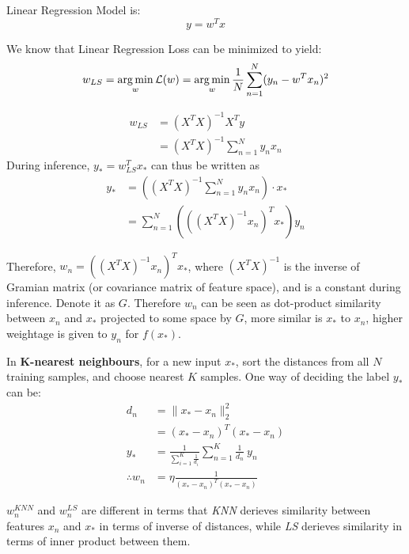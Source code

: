 \documentclass[a4paper,11pt]{article}
\begin{document}
\begin{mlsolution}
    
Linear Regression Model is:
$$y = w^T x$$

We know that Linear Regression Loss can be minimized to yield:
$$w_{LS} = \mathop{\arg\min}_w \mathcal{L}(w) = \mathop{\arg\min}_w \frac{1}{N} \sum_{n=1}^{N} (y_n - w^T x_n)^2$$

\begin{align}
    w_{LS} &= (X^T X)^{-1} X^T y \\
           &= (X^T X)^{-1} \sum_{n=1}^{N} y_n x_n
\end{align}
During inference, $y_* = w^T_{LS} x_*$ can thus be written as
\begin{align*}
y_* &= ((X^T X)^{-1} \sum_{n=1}^{N} y_n x_n) \cdot x_* \\
    &= \sum_{n=1}^{N} \left(((X^T X)^{-1} x_n)^T x_*\right) y_n
\end{align*}

Therefore, $w_n = ((X^T X)^{-1} x_n)^T x_*$, where $(X^T X)^{-1}$ is the inverse of Gramian matrix (or covariance matrix of feature space), and is a constant during inference. Denote it as $G$. Therefore $w_n$ can be seen as dot-product similarity between $x_n$ and $x_*$ projected to some space by $G$, more similar is $x_*$ to $x_n$, higher weightage is given to $y_n$ for $f(x_*)$.

In \textbf{K-nearest neighbours}, for a new input $x_*$, sort the distances from all $N$ training samples, and choose nearest $K$ samples. One way of deciding the label $y_*$ can be:
\begin{align*}
d_n &= \lVert x_* - x_n \rVert _2^2 \\ 
    &= (x_* - x_n)^T(x_* - x_n) \\
y_* &= \frac{1}{\sum_{i=1}^{K} \frac{1}{d_i}} \sum_{n=1}^{K} \frac{1}{d_n}\ y_n \\
\therefore w_n &= \eta \frac{1}{(x_* - x_n)^T(x_* - x_n)}
\end{align*}

$w_n^\textit{KNN}$ and $w_n^\textit{LS}$ are different in terms that \textit{KNN} derieves similarity between features $x_n$ and $x_*$ in terms of inverse of distances, while \textit{LS} derieves similarity in terms of inner product between them.

\end{mlsolution}
\end{document}
